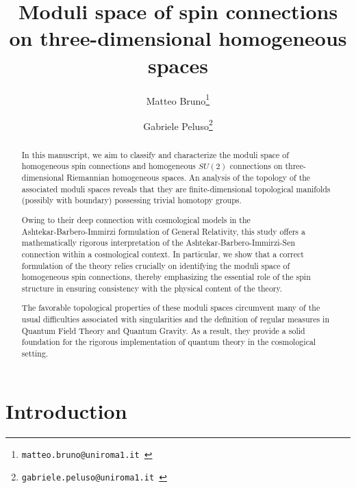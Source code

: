 \documentclass{article}
\numberwithin{equation}{section}
\theoremstyle{definition}
\begin{document}
\title{Moduli space of spin connections on three-dimensional homogeneous spaces}

\author[1,3]{Matteo Bruno\footnote{\texttt{matteo.bruno@uniroma1.it }}}
\author[2]{Gabriele Peluso\footnote{\texttt{gabriele.peluso@uniroma1.it }}}

\date{}

\maketitle

\begin{abstract}
In this manuscript, we aim to classify and characterize the moduli space of homogeneous spin connections and homogeneous $SU(2)$ connections on three-dimensional Riemannian homogeneous spaces. An analysis of the topology of the associated moduli spaces reveals that they are finite-dimensional topological manifolds (possibly with boundary) possessing trivial homotopy groups.

\medskip

Owing to their deep connection with cosmological models in the\\ Ashtekar-Barbero-Immirzi formulation of General Relativity, this study offers a mathematically rigorous interpretation of the Ashtekar-Barbero-Immirzi-Sen connection within a cosmological context. In particular, we show that a correct formulation of the theory relies crucially on identifying the moduli space of homogeneous spin connections, thereby emphasizing the essential role of the spin structure in ensuring consistency with the physical content of the theory.

\medskip

The favorable topological properties of these moduli spaces circumvent many of the usual difficulties associated with singularities and the definition of regular measures in Quantum Field Theory and Quantum Gravity. As a result, they provide a solid foundation for the rigorous implementation of quantum theory in the cosmological setting.
\end{abstract}


\section{Introduction}
\label{sec:Intro}
\end{document}
